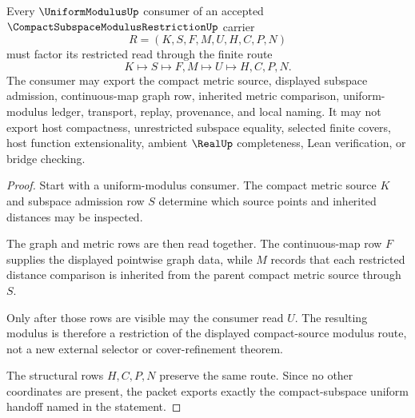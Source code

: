 \begin{theorem}
\label{thm:compact-subspace-modulus-restriction-uniform-handoff}
Every $\UniformModulusUp$ consumer of an accepted $\CompactSubspaceModulusRestrictionUp$ carrier
$$
R=(K,S,F,M,U,H,C,P,N)
$$
must factor its restricted read through the finite route
$$
K \longmapsto S \longmapsto F,M \longmapsto U \longmapsto H,C,P,N .
$$
The consumer may export the compact metric source, displayed subspace admission, continuous-map graph row, inherited metric comparison, uniform-modulus ledger, transport, replay, provenance, and local naming. It may not export host compactness, unrestricted subspace equality, selected finite covers, host function extensionality, ambient $\RealUp$ completeness, Lean verification, or bridge checking.
\end{theorem}
\begin{proof}
Start with a uniform-modulus consumer. The compact metric source $K$ and subspace admission row $S$ determine which source points and inherited distances may be inspected.

The graph and metric rows are then read together. The continuous-map row $F$ supplies the displayed pointwise graph data, while $M$ records that each restricted distance comparison is inherited from the parent compact metric source through $S$.

Only after those rows are visible may the consumer read $U$. The resulting modulus is therefore a restriction of the displayed compact-source modulus route, not a new external selector or cover-refinement theorem.

The structural rows $H,C,P,N$ preserve the same route. Since no other coordinates are present, the packet exports exactly the compact-subspace uniform handoff named in the statement.
\end{proof}



